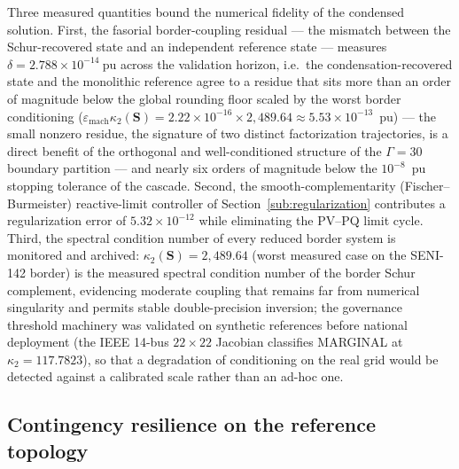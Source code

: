 Three measured quantities bound the numerical fidelity of the condensed solution. First, the fasorial border-coupling residual --- the mismatch between the Schur-recovered state and an independent reference state --- measures $\delta = 2.788 \times 10^{-14}\ \mathrm{pu}$ across the validation horizon, i.e.\ the condensation-recovered state and the monolithic reference agree to a residue that sits more than an order of magnitude below the global rounding floor scaled by the worst border conditioning ($\varepsilon_{\mathrm{mach}}\kappa_2(\mathbf{S}) = 2.22 \times 10^{-16} \times 2{,}489.64 \approx 5.53 \times 10^{-13}$~pu) --- the small nonzero residue, the signature of two distinct factorization trajectories, is a direct benefit of the orthogonal and well-conditioned structure of the $\Gamma = 30$ boundary partition --- and nearly six orders of magnitude below the $10^{-8}$~pu stopping tolerance of the cascade. Second, the smooth-complementarity (Fischer--Burmeister) reactive-limit controller of Section~\ref{sub:regularization} contributes a regularization error of $5.32 \times 10^{-12}$ while eliminating the PV--PQ limit cycle. Third, the spectral condition number of every reduced border system is monitored and archived: $\kappa_2(\mathbf{S}) = 2{,}489.64$ (worst measured case on the SENI-142 border) is the measured spectral condition number of the border Schur complement, evidencing moderate coupling that remains far from numerical singularity and permits stable double-precision inversion; the governance threshold machinery was validated on synthetic references before national deployment (the IEEE 14-bus $22\times22$ Jacobian classifies MARGINAL at $\kappa_2 = 117.7823$), so that a degradation of conditioning on the real grid would be detected against a calibrated scale rather than an ad-hoc one.

\subsection{Contingency resilience on the reference topology}
\label{sub:contingencies}

